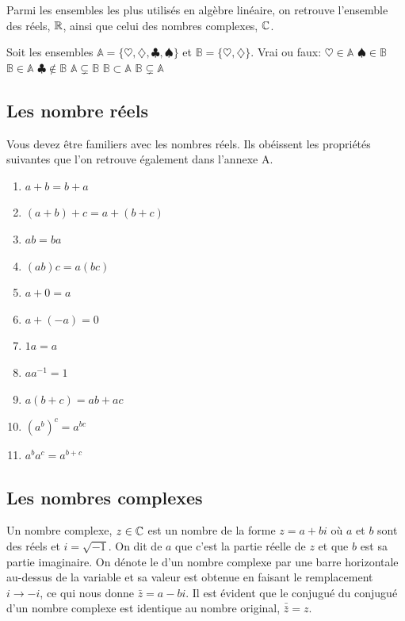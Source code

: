 Parmi les ensembles les plus utilisés en algèbre linéaire, on retrouve l'ensemble des réels, $\mathbb{R}$, ainsi que celui
des nombres complexes, $\mathbb{C}$.

\begin{exerciceB}
	Soit les ensembles $\mathbb{A} = \{\heartsuit, \diamondsuit, \clubsuit, \spadesuit\}$ et
	$\mathbb{B} = \{\heartsuit, \diamondsuit\}$. Vrai ou faux:
	 $\heartsuit \in \mathbb{A} $
	 $\spadesuit \in \mathbb{B}$
	 $\mathbb{B} \in \mathbb{A}$
	 $\clubsuit \notin \mathbb{B}$
	 $\mathbb{A} \subsetneq \mathbb{B}$
	 $\mathbb{B} \subset \mathbb{A}$
	 $\mathbb{B} \subsetneq \mathbb{A}$
\end{exerciceB}

\subsection{Les nombre réels}

Vous devez être familiers avec les nombres réels.  Ils obéissent les propriétés suivantes que
l'on retrouve également dans l'annexe A.

\begin{enumerate}
\item $a+b = b+a$ \qquad {}
\item $(a+b) + c = a + (b+c)$ \qquad {}
\item $ab = ba$ \qquad {}
\item $(ab)c = a(bc)$ \qquad {}
\item $a + 0 = a$ \qquad {}
\item $a + (-a) = 0$ 
\item $1a = a$ \qquad {}
\item $a a^{-1} = 1$ 
\item $a(b+c) = ab + ac$ \qquad {}
\item $\left(a^b\right)^c = a^{bc}$ \qquad {}
\item $a^b a^c = a^{b+c}$ \qquad {}
\end{enumerate}

\subsection{Les nombres complexes}
Un nombre complexe, $z \in\mathbb{C}$ est un nombre de la forme $z= a + bi$ où $a$ et $b$ sont des réels
et $i=\sqrt{-1}$.  On dit de $a$ que c'est la partie réelle de $z$ et que $b$ est sa partie imaginaire.  
On dénote le  d'un nombre complexe par une barre horizontale
au-dessus de la variable et sa valeur est obtenue en faisant le remplacement $i\rightarrow -i$, ce
qui nous donne $\bar{z} = a - bi$. Il est évident que le conjugué du conjugué d'un nombre complexe est
identique au nombre original, $\bar{\bar{z}} = z$.

